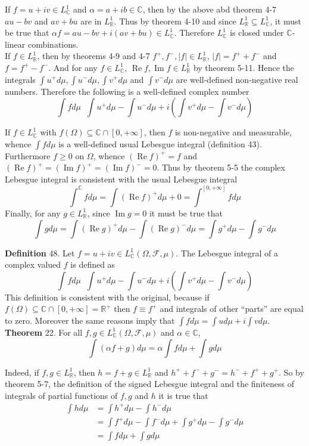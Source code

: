 \documentclass[a4paper]{article}
\newcommand{\clo}[1]{\left [ #1 \right ]}
\newcommand{\brac}[1]{\left ( #1 \right )}
\newcommand{\abs}[1]{\left | #1 \right |}
\newcommand{\Real}{\mathbb{R}}
\newcommand{\Zinf}{\clo{ 0, +\infty }}
\newcommand{\Cplx}{\mathbb{C}}
\newcommand{\Fcal}{\mathcal{F}}
\newcommand{\defn}{\mathop{\overset{\Delta}{=}}\nolimits}
\newcommand{\re}{\operatorname{Re}\nolimits}
\newcommand{\im}{\operatorname{Im}\nolimits}
\begin{document}
If $f=u+iv\in L^1_\Cplx$ and $\alpha=a+ib\in \Cplx$, then by the above abd theorem 4-7 $au-bv$ and $av+bu$ are in $L^1_\Real$. Thus by theorem 4-10 and since $L^1_\Real\subseteq L^1_\Cplx$, it must be true that $\alpha f = au-bv + i\brac{av+bu}\in L^1_\Cplx$. Therefore $L^1_\Cplx$ is closed under $\Cplx$-linear combinations.\\

If $f\in L^1_\Real$, then by theorems 4-9 and 4-7 $f^+, f^-, \abs{f}\in L^1_\Real$, $\abs{f}=f^++f^-$ and $f = f^+-f^-$. And for any $f\in L^1_\Cplx$, $\re f, \im f\in L^1_\Real$ by theorem 5-11. Hence the integrals $\int u^+ d\mu, \int u^- d\mu, \int v^+ d\mu$ and $\int v^- d\mu$ are well-defined non-negative real numbers. Therefore the following is a well-defined complex number \[\int fd\mu \defn \int u^+ d\mu - \int u^- d\mu + i\brac{ \int v^+ d\mu - \int v^- d\mu }\]

If $f\in L^1_\Cplx$ with $f\brac{\Omega}\subseteq \Cplx\cap \Zinf$, then $f$ is non-negative and measurable, whence $\int f d\mu$ is a well-defined usual Lebesgue integral (definition  43). Furthermore $f\geq 0$ on $\Omega$, whence $\brac{\re f}^+ = f$ and $\brac{\re f}^+=\brac{\im f}^+=\brac{\im f}^- = 0$. Thus by theorem 5-5 the complex Lebesgue integral is consistent with the usual Lebesgue integral \[\int^\Cplx f d\mu = \int \brac{\re f}^+ d\mu + 0 = \int^{\Zinf} f d\mu\] Finally, for any $g\in L^1_\Real$, since $\im g = 0$ it must be true that \[\int g d\mu = \int \brac{\re g}^+ d\mu - \int \brac{\re g}^- d\mu = \int g^+ d\mu - \int g^- d\mu\]

\noindent \textbf{Definition} 48.
Let $f = u + iv \in L^1_\Cplx\brac{\Omega, \Fcal, \mu}$. The Lebesgue integral of a complex valued $f$ is defined as \[\int f d\mu \defn \int u^+ d\mu - \int u^- d\mu + i\brac{\int v^+ d\mu - \int v^- d\mu } \] This definition is consistent with the original, because if $f\brac{\Omega}\subseteq \Cplx\cap \Zinf = \Real^+$ then $f \equiv f^+$ and integrals of other ``parts'' are equal to zero. Moreover the same reasons imply that $\int f d\mu = \int u d\mu + i\int v d\mu$.\\

\label{thm:lin_cpls_int} \noindent \textbf{Theorem} 22.
For all $f,g\in L^1_\Cplx\brac{\Omega, \Fcal, \mu}$ and $\alpha \in \Cplx$, \[\int \brac{\alpha f + g} d\mu = \alpha \int f d\mu + \int g d\mu\]

Indeed, if $f,g\in L^1_\Real$, then $h = f+g \in L^1_\Real$ and $h^+ + f^- + g^- = h^- + f^+ + g^+$. So by theorem 5-7, the definition of the signed Lebesgue integral and the finiteness of integrals of partial functions of $f,g$ and $h$ it is true that \begin{align*}\int h d\mu &= \int h^+ d\mu - \int h^- d\mu \\ &= \int f^+ d\mu - \int f^- d\mu + \int g^+ d\mu -  \int g^- d\mu \\&= \int f d\mu + \int g d\mu\end{align*}
\end{document}
